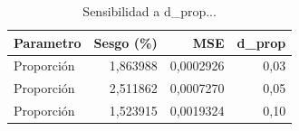 \begin{table}

\caption{Sensibilidad a d_prop...}
\centering
\begin{tabular}[t]{lrrr}
\toprule
Parametro & Sesgo (\%) & MSE & d\_prop\\
\midrule
Proporción & 1,863988 & 0,0002926 & 0,03\\
Proporción & 2,511862 & 0,0007270 & 0,05\\
Proporción & 1,523915 & 0,0019324 & 0,10\\
\bottomrule
\end{tabular}
\end{table}
